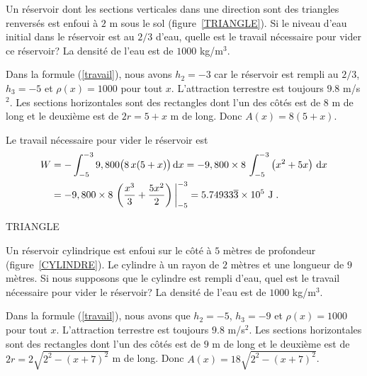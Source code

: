 {

\begin{egg}
Un réservoir dont les sections verticales dans une direction sont des
triangles renversés est enfoui à $2$ m sous le
sol (figure~\ref{TRIANGLE}).  Si le niveau d'eau initial dans le
réservoir est au $2/3$ d'eau, quelle est le travail nécessaire pour
vider ce réservoir?  La densité de l'eau est de $1000$ kg/m$^3$.

Dans la formule (\ref{travail}), nous avons $h_2=-3$ car le réservoir
est rempli au $2/3$, $h_3=-5$ et $\rho(x) = 1000$ pour tout $x$.  L'attraction
terrestre est toujours $9.8$ m/s$^2$.  Les sections horizontales
sont des rectangles dont l'un des côtés est de $8$ m de long et le deuxième
est de $2r = 5+x$ m de long.  Donc $\displaystyle A(x) = 8(5+x)$.

Le travail nécessaire pour vider le réservoir est
\begin{align*}
W & = - \int_{-5}^{-3} 9,800\big( 8\, x(5+x) \big)\,\mathrm{d}x
= - 9,800 \times 8 \, \int_{-5}^{-3} \left( x^2 + 5x \right) \,\mathrm{d}x \\
&= - 9,800 \times 8 \, \left( \frac{x^3}{3} + \frac{5x^2}{2}
 \right)\bigg|_{-5}^{-3} 
= 5.74933\overline{3}\times 10^5\ \text{J} \; .
\end{align*}
\end{egg}

{TRIANGLE}

\begin{egg}
Un réservoir cylindrique est enfoui sur le côté à $5$ mètres de
profondeur (figure~\ref{CYLINDRE}).  Le cylindre à un rayon de $2$
mètres et une longueur de $9$ mètres.  Si nous supposons que le cylindre
est rempli d'eau, quel est le travail nécessaire pour vider le
réservoir?  La densité de l'eau est de $1000$ kg/m$^3$.

Dans la formule (\ref{travail}), nous avons que
$h_2=-5$, $h_3=-9$ et $\rho(x) = 1000$ pour tout $x$.  L'attraction
terrestre est toujours $9.8$ m/s$^2$.  Les sections horizontales sont
des rectangles dont l'un des côtés
est de $9$ m de long et le deuxième est de
$\displaystyle 2r = 2\sqrt{2^2-(x+7)^2}$ m de long.  Donc
$\displaystyle A(x) = 18\sqrt{2^2-(x+7)^2}$.


\end{egg}}
